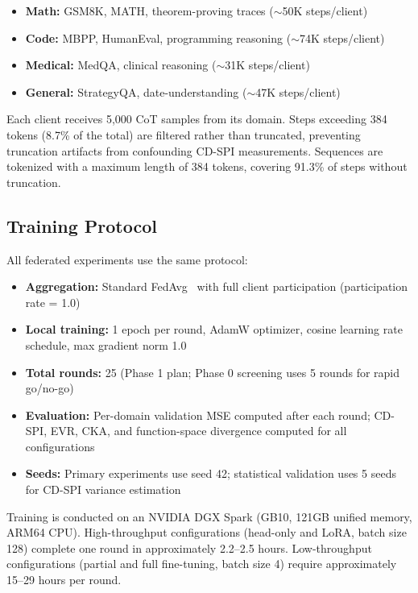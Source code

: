 \documentclass{article}
\begin{document}
\begin{itemize}[nosep]
    \item \textbf{Math:} GSM8K, MATH, theorem-proving traces ($\sim$50K steps/client)
    \item \textbf{Code:} MBPP, HumanEval, programming reasoning ($\sim$74K steps/client)
    \item \textbf{Medical:} MedQA, clinical reasoning ($\sim$31K steps/client)
    \item \textbf{General:} StrategyQA, date-understanding ($\sim$47K steps/client)
\end{itemize}

Each client receives 5,000 CoT samples from its domain.
Steps exceeding 384 tokens (8.7\% of the total) are filtered rather than truncated, preventing truncation artifacts from confounding CD-SPI measurements.
Sequences are tokenized with a maximum length of 384 tokens, covering 91.3\% of steps without truncation.

\subsection{Training Protocol}

All federated experiments use the same protocol:
\begin{itemize}[nosep]
    \item \textbf{Aggregation:} Standard FedAvg~\cite{fedavg2017} with full client participation (participation rate = 1.0)
    \item \textbf{Local training:} 1 epoch per round, AdamW optimizer, cosine learning rate schedule, max gradient norm 1.0
    \item \textbf{Total rounds:} 25 (Phase 1 plan; Phase 0 screening uses 5 rounds for rapid go/no-go)
    \item \textbf{Evaluation:} Per-domain validation MSE computed after each round; CD-SPI, EVR, CKA, and function-space divergence computed for all configurations
    \item \textbf{Seeds:} Primary experiments use seed 42; statistical validation uses 5 seeds for CD-SPI variance estimation
\end{itemize}

Training is conducted on an NVIDIA DGX Spark (GB10, 121GB unified memory, ARM64 CPU).
High-throughput configurations (head-only and LoRA, batch size 128) complete one round in approximately 2.2--2.5 hours.
Low-throughput configurations (partial and full fine-tuning, batch size 4) require approximately 15--29 hours per round.
\end{document}
